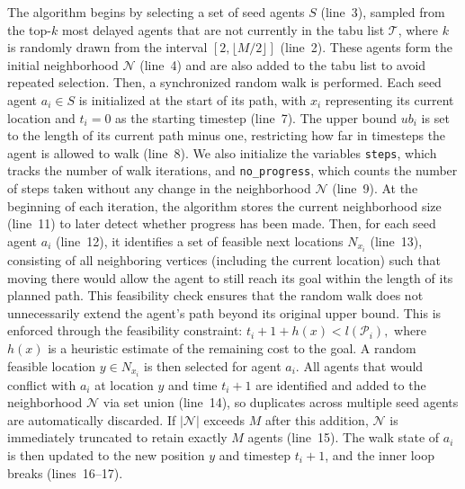 \documentclass[review]{jair}
\begin{document}
The algorithm begins by selecting a set of seed agents \( S \) (line~3), sampled from the top-\( k \) most delayed agents that are not currently in the tabu list \( \mathcal{T} \), where \( k \) is randomly drawn from the interval \([2, \lfloor M/2 \rfloor]\) (line~2). These agents form the initial neighborhood \( \mathcal{N} \) (line~4) and are also added to the tabu list to avoid repeated selection. Then, a synchronized random walk is performed. Each seed agent \( a_i \in S \) is initialized at the start of its path, with \( x_i \) representing its current location and \( t_i = 0 \) as the starting timestep (line~7). The upper bound \( ub_i \) is set to the length of its current path minus one, restricting how far in timesteps the agent is allowed to walk (line~8). We also initialize the variables \texttt{steps}, which tracks the number of walk iterations, and \texttt{no\_progress}, which counts the number of steps taken without any change in the neighborhood \( \mathcal{N} \) (line~9).
At the beginning of each iteration, the algorithm stores the current neighborhood size (line~11) to later detect whether progress has been made. Then, for each seed agent \( a_i \) (line~12), it identifies a set of feasible next locations \( N_{x_i} \) (line~13), consisting of all neighboring vertices (including the current location) such that moving there would allow the agent to still reach its goal within the length of its planned path. This feasibility check ensures that the random walk does not unnecessarily extend the agent’s path beyond its original upper bound. This is enforced through the feasibility constraint: \(t_i + 1 + h(x) < l(\mathcal{P}_i),\) where \( h(x) \) is a heuristic estimate of the remaining cost to the goal.
A random feasible location \( y \in N_{x_i} \) is then selected for agent \( a_i \). All agents that would conflict with \( a_i \) at location \( y \) and time \( t_i + 1 \) are identified and added to the neighborhood \( \mathcal{N} \) via set union (line~14), so duplicates across multiple seed agents are automatically discarded. If \( |\mathcal{N}| \) exceeds \( M \) after this addition, \( \mathcal{N} \) is immediately truncated to retain exactly \( M \) agents (line~15). The walk state of \( a_i \) is then updated to the new position \( y \) and timestep \( t_i + 1 \), and the inner loop breaks (lines~16--17).
\end{document}
